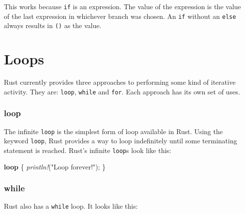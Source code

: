 \documentclass[a4paper,]{book}
\newenvironment{Shaded}{\begin{snugshade}}{\end{snugshade}}
\newcommand{\KeywordTok}[1]{\textcolor[rgb]{0.13,0.29,0.53}{\textbf{{#1}}}}
\newcommand{\DecValTok}[1]{\textcolor[rgb]{0.00,0.00,0.81}{{#1}}}
\newcommand{\ConstantTok}[1]{\textcolor[rgb]{0.00,0.00,0.00}{{#1}}}
\newcommand{\StringTok}[1]{\textcolor[rgb]{0.31,0.60,0.02}{{#1}}}
\newcommand{\CommentTok}[1]{\textcolor[rgb]{0.56,0.35,0.01}{\textit{{#1}}}}
\newcommand{\PreprocessorTok}[1]{\textcolor[rgb]{0.56,0.35,0.01}{\textit{{#1}}}}
\newcommand{\NormalTok}[1]{{#1}}
\begin{document}
This works because \texttt{if} is an expression. The value of the
expression is the value of the last expression in whichever branch was
chosen. An \texttt{if} without an \texttt{else} always results in
\texttt{()} as the value.

\section{Loops}\label{sec--loops}

Rust currently provides three approaches to performing some kind of
iterative activity. They are: \texttt{loop}, \texttt{while} and
\texttt{for}. Each approach has its own set of uses.

\subsubsection{loop}\label{loop}

The infinite \texttt{loop} is the simplest form of loop available in
Rust. Using the keyword \texttt{loop}, Rust provides a way to loop
indefinitely until some terminating statement is reached. Rust's
infinite \texttt{loop}s look like this:

\begin{Shaded}
\begin{Highlighting}[]
\KeywordTok{loop} \NormalTok{\{}
    \PreprocessorTok{println!}\NormalTok{(}\StringTok{"Loop forever!"}\NormalTok{);}
\NormalTok{\}}
\end{Highlighting}
\end{Shaded}

\subsubsection{while}\label{while}

Rust also has a \texttt{while} loop. It looks like this:

\begin{Shaded}
\end{Shaded}
\end{document}
